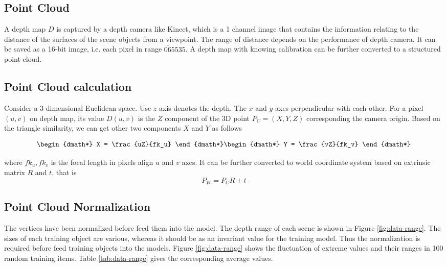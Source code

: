 \subsection{Point Cloud}
\label{sec:depth-map-to-point-cloud}

A depth map $ D $ is captured by a depth camera like Kinect, which is a 1 channel image that contains the information relating to the distance of the surfaces of the scene objects from a viewpoint. The range of distance depends on the performance of depth camera. It can be saved as a 16-bit image, i.e. each pixel in range $0 \tilde 65535$. A depth map with knowing calibration can be further converted to a structured point cloud. 


\subsection{Point Cloud calculation}

Consider a 3-dimensional Euclidean space. Use $ z $ axis denotes the depth. The $ x  $ and $ y $ axes perpendicular with each other. For a pixel $ (u,v) $ on depth map, its value $ D(u,v) $ is the $ Z $ component of the 3D point $P_C = (X,Y,Z) $ corresponding the camera origin. Based on the triangle similarity, we can get other two components $ X $ and $ Y $ as follows

\begin{dgroup*}
	
	\begin{dmath*}
		X = \frac{uZ}{fk_u}
	\end{dmath*}
	\begin{dmath*}
		Y = \frac{vZ}{fk_v}
	\end{dmath*}
\end{dgroup*}

where $ fk_u, fk_v $ is the focal length in pixels align $ u $ and $ v $ axes.
It can be further converted to world coordinate system based on extrinsic matrix $ R $ and $ t $, that is
\[P_W = P_CR+t \]

\subsection{Point Cloud Normalization}


\label{sec:dataset-normalization}

The vertices have been normalized before feed them into the model. The depth range of each scene is shown in Figure \ref{fig:data-range}.
The sizes of each training object are various, whereas it should be as an invariant value for the training model. Thus the normalization is required before feed training objects into the models. Figure \ref{fig:data-range} shows the fluctuation of extreme values and their ranges in 100 random training items. Table \ref{tab:data-range} gives the corresponding average values.


